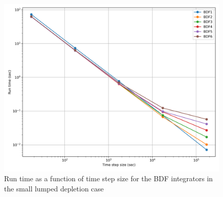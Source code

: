 \clearpage

\begin{figure}[p]
    \centering
    \includegraphics[width=5in]{images/chapter-5/caseStudies/smallLumpedDepletion/msrLumpedDepletionSmallIntegratorRuntimes.png}
    \caption{Run time as a function of time step size for the BDF integrators in the small lumped depletion case}
    \label{fig:small_lumped_depletion_integrator_runtimes}
\end{figure}

\clearpage

